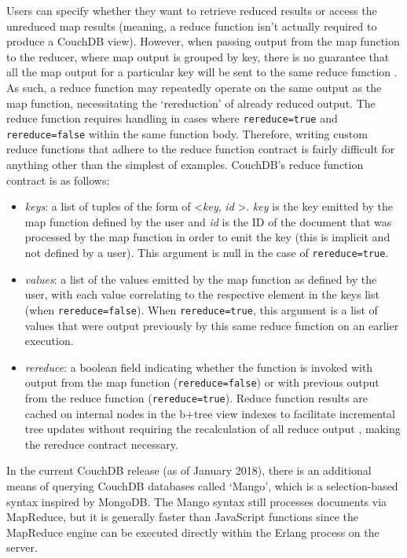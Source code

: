 Users can specify whether they want to retrieve reduced results or access the unreduced map results (meaning, a reduce function isn't actually required to produce a CouchDB view). However, when passing output from the map function to the reducer, where map output is grouped by key, there is no guarantee that all the map output for a particular key will be sent to the same reduce function \cite{reduceFunctions}. As such, a reduce function may repeatedly operate on the same output as the map function, necessitating the `rereduction' of already reduced output. The reduce function requires handling in cases where \texttt{rereduce=true} and \texttt{rereduce=false} within the same function body. Therefore, writing custom reduce functions that adhere to the reduce function contract is fairly difficult for anything other than the simplest of examples. CouchDB's reduce function contract is as follows:

\begin{itemize}
    \item \textit{keys}: a list of tuples of the form of \textless \textit{key}, \textit{id} \textgreater. \textit{key} is the key emitted by the map function defined by the user and \textit{id} is the ID of the document that was processed by the map function in order to emit the key (this is implicit and not defined by a user). This argument is null in the case of \texttt{rereduce=true}.
    \item \textit{values}: a list of the values emitted by the map function as defined by the user, with each value correlating to the respective element in the keys list (when \texttt{rereduce=false}). When \texttt{rereduce=true}, this argument is a list of values that were output previously by this same reduce function on an earlier execution.
    \item \textit{rereduce}: a boolean field indicating whether the function is invoked with output from the map function (\texttt{rereduce=false}) or with previous output from the reduce function (\texttt{rereduce=true}). Reduce function results are cached on internal nodes in the b+tree view indexes to facilitate incremental tree updates without requiring the recalculation of all reduce output \cite{slack25Oct}, making the rereduce contract necessary.
\end{itemize}

In the current CouchDB release (as of January 2018), there is an additional means of querying CouchDB databases called `Mango', which is a selection-based syntax inspired by MongoDB. The Mango syntax still processes documents via MapReduce, but it is generally faster than JavaScript functions since the MapReduce engine can be executed directly within the Erlang process on the server.

